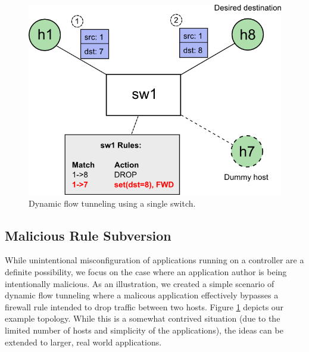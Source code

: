\begin{figure}[ht!]
	\begin{center}
		\includegraphics[width=\columnwidth]{figs/singleSwitch_diagram.png}
		\caption{Dynamic flow tunneling using a single switch.}
		\label{fig:dft_single}
	\end{center}
\end{figure}

\subsection{Malicious Rule Subversion}
While unintentional misconfiguration of applications running on a controller are a definite possibility, we focus on the case where an application author is being intentionally malicious.
As an illustration, we created a simple scenario of dynamic flow tunneling where a malicous application effectively bypasses a firewall rule intended to drop traffic between two hosts.
Figure \ref{fig:dft_single} depicts our example topology.
While this is a somewhat contrived situation (due to the limited number of hosts and simplicity of the applications), the ideas can be extended to larger, real world applications.

